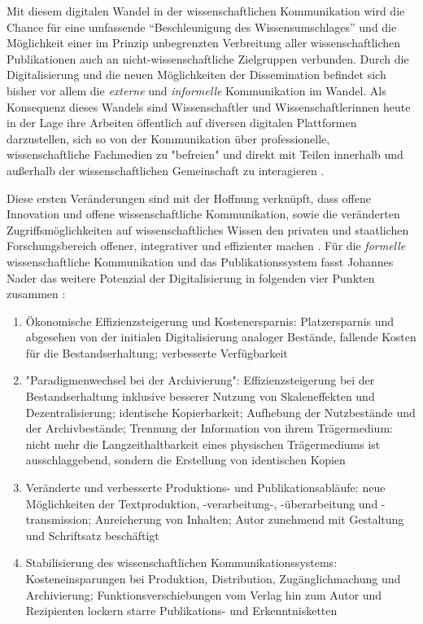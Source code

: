 Mit diesem digitalen Wandel in der wissenschaftlichen Kommunikation wird die Chance für eine umfassende “Beschleunigung des Wissensumschlages” \cite{Wenzel_2003} und die Möglichkeit einer im Prinzip unbegrenzten Verbreitung aller wissenschaftlichen Publikationen \cite{bbaw_publizieren_2015} \cite{yiotis_2013_open} auch an nicht-wissenschaftliche Zielgruppen \cite{Konneker_2013} verbunden. Durch die Digitalisierung und die neuen Möglichkeiten der Dissemination befindet sich bisher vor allem die \textit{externe} und \textit{informelle} Kommunikation im Wandel. Als Konsequenz dieses Wandels sind Wissenschaftler und Wissenschaftlerinnen heute in der Lage ihre Arbeiten öffentlich auf diversen digitalen Plattformen darzustellen, sich so von der Kommunikation über professionelle, wissenschaftliche Fachmedien zu "befreien" und direkt mit Teilen innerhalb und außerhalb der wissenschaftlichen Gemeinschaft zu interagieren \cite{Konneker_2013}.

Diese ersten Veränderungen sind mit der Hoffnung verknüpft, dass offene Innovation und offene wissenschaftliche Kommunikation, sowie die veränderten Zugriffsmöglichkeiten auf wissenschaftliches Wissen \cite[:109]{naeder_2010_open} den privaten und staatlichen Forschungsbereich offener, integrativer und effizienter machen \cite{harmon_2012_commercialization}. Für die \textit{formelle} wissenschaftliche Kommunikation und das Publikationssystem fasst Johannes Nader das weitere Potenzial der Digitalisierung in folgenden vier Punkten zusammen \cite[:66-76]{naeder_2010_open}:
\begin{enumerate}
\item Ökonomische Effizienzsteigerung und Kostenersparnis: Platzersparnis und abgesehen von der initialen Digitalisierung analoger Bestände, fallende Kosten für die Bestandserhaltung; verbesserte Verfügbarkeit
\item "Paradigmenwechsel bei der Archivierung": Effizienzsteigerung bei der Bestandserhaltung inklusive besserer Nutzung von Skaleneffekten und Dezentralisierung; identische Kopierbarkeit; Aufhebung der Nutzbestände und der Archivbestände; Trennung der Information von ihrem Trägermedium: nicht mehr die Langzeithaltbarkeit eines physischen Trägermediums ist ausschlaggebend, sondern die Erstellung von identischen Kopien
\item Veränderte und verbesserte Produktions- und Publikationsabläufe: neue Möglichkeiten der Textproduktion, -verarbeitung-, -überarbeitung und -transmission; Anreicherung von Inhalten; Autor zunehmend mit Gestaltung und Schriftsatz beschäftigt
\item Stabilisierung des wissenschaftlichen Kommunikationssystems: Kosteneinsparungen bei Produktion, Distribution, Zugänglichmachung und Archivierung; Funktionsverschiebungen vom Verlag hin zum Autor und Rezipienten lockern starre Publikations- und Erkenntnisketten
\end{enumerate}

